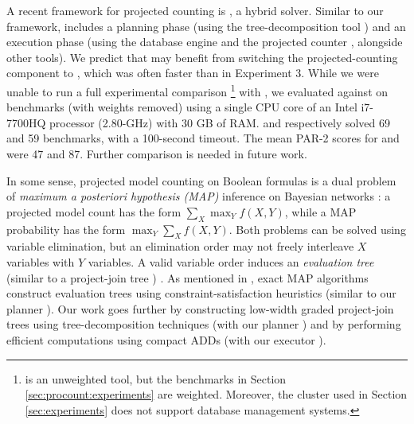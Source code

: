 A recent framework for projected counting is \nest{} \cite{hecher2020taming}, a hybrid solver.
Similar to our framework, \nest{} includes a planning phase (using the tree-decomposition tool \htd{} \cite{AMW17}) and an execution phase (using the database engine  \cite{stonebraker1986design} and the projected counter \projmc{} \cite{lagniez2019recursive}, alongside other tools).
We predict that \nest{} may benefit from switching the projected-counting component to \procount{}, which was often faster than \projmc{} in Experiment 3.
While we were unable to run a full experimental comparison%
\footnote{\nest{} is an unweighted tool, but the benchmarks in Section \ref{sec:procount:experiments} are weighted.
Moreover, the cluster used in Section \ref{sec:experiments} does not support database management systems.}
with \nest{}, we evaluated \nest{} against \procount{} on \wapsBenchmarks{} benchmarks \cite{gupta2019waps} (with weights removed) using a single CPU core of an Intel i7-7700HQ processor (2.80-GHz) with 30 GB of RAM.
\procount{} and \nest{} respectively solved 69 and 59 benchmarks, with a 100-second timeout.
The mean PAR-2 scores for \procount{} and \nest{} were 47 and 87.
Further comparison is needed in future work.


In some sense, projected model counting on Boolean formulas is a dual problem of \emph{maximum a posteriori hypothesis (MAP)} inference \cite{murphy2012machine,maua2015complexity,xue2016solving} on Bayesian networks \cite{pearl1985bayesian}: a projected model count has the form $\sum_X \max_Y f(X, Y)$, while a MAP probability has the form $\max_Y \sum_X f(X, Y)$.
Both problems can be solved using variable elimination, but an elimination order may not freely interleave $X$ variables with $Y$ variables.
A valid variable order induces an \emph{evaluation tree} (similar to a project-join tree%
) \cite{park2004complexity}.
As mentioned in \cite{park2004complexity}, exact MAP algorithms construct evaluation trees using constraint-satisfaction heuristics (similar to our planner \htb).
Our work goes further by constructing low-width graded project-join trees using tree-decomposition techniques (with our planner \Lg) and by performing efficient computations using compact ADDs (with our executor \Dmc).
